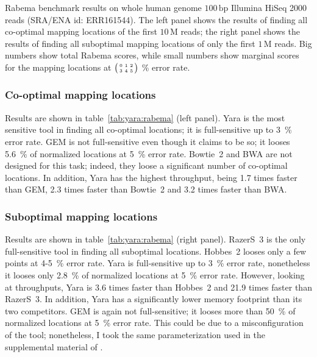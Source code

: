 \begin{table*}[t]
  \caption[Yara results in the Rabema benchmark]
  {
  \label{tab:yara:rabema}
    Rabema benchmark results on whole human genome $100\,\text{bp}$ Illumina HiSeq 2000 reads (SRA/ENA id: ERR161544).
    The left panel shows the results of finding all co-optimal mapping locations of the first $10\,\text{M}$ reads; the right panel shows the results of finding all suboptimal mapping locations of only the first $1\,\text{M}$ reads.
    Big numbers show total Rabema scores, while small numbers show marginal scores for the mapping locations at
    $\bigl(\begin{smallmatrix}\mbox{\tiny 0}&\mbox{\tiny 1}&\mbox{\tiny 2}\\\mbox{\tiny 3}&\mbox{\tiny 4}&\mbox{\tiny 5}\end{smallmatrix}\bigr)$ \% error rate.
    }
  \vspace{-3mm}
  \center
  \sffamily
  \resizebox{0.99\textwidth}{!}
  {
	\renewcommand{\tabcolsep}{0.8ex}
	
	
  }
\end{table*}

\subsubsection{Co-optimal mapping locations}
Results are shown in table~\ref{tab:yara:rabema} (left panel).
Yara is the most sensitive tool in finding all co-optimal locations; it is full-sensitive up to 3~\% error rate.
GEM is not full-sensitive even though it claims to be so; it looses 5.6~\% of normalized locations at 5~\% error rate.
Bowtie~2 and BWA are not designed for this task; indeed, they loose a significant number of co-optimal locations.
In addition, Yara has the highest throughput, being 1.7 times faster than GEM, 2.3 times faster than Bowtie~2 and 3.2 times faster than BWA.

\subsubsection{Suboptimal mapping locations}
Results are shown in table~\ref{tab:yara:rabema}  (right panel).
RazerS~3 is the only full-sensitive tool in finding all suboptimal locations.
Hobbes~2 looses only a few points at 4-5~\% error rate.
Yara is full-sensitive up to 3~\% error rate, nonetheless it looses only 2.8~\% of normalized locations at 5~\% error rate.
However, looking at throughputs, Yara is 3.6 times faster than Hobbes~2 and 21.9 times faster than RazerS~3.
In addition, Yara has a significantly lower memory footprint than its two competitors.
GEM is again not full-sensitive; it looses more than 50~\% of normalized locations at 5~\% error rate.
This could be due to a misconfiguration of the tool; nonetheless, I took the same parameterization used in the supplemental material of \citep{MarcoSola2012}.

